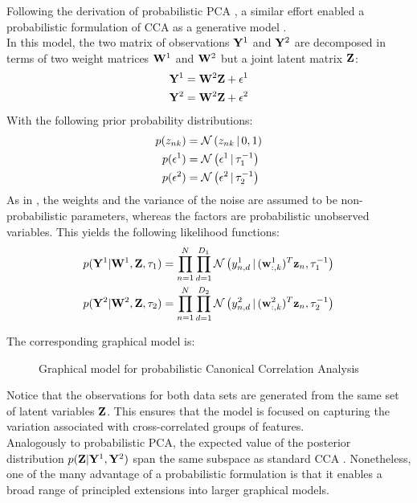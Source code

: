 Following the derivation of probabilistic PCA \cite{Tipping1999}, a similar effort enabled a probabilistic formulation of CCA as a generative model \cite{Bach2005}.\\
In this model, the two matrix of observations ${\bf Y}^{1}$ and ${\bf Y}^{2}$ are decomposed in terms of two weight matrices ${\bf W}^{1}$ and ${\bf W}^{2}$ but a joint latent matrix ${\bf Z}$:
\begin{align*}
	{\bf Y}^{1} &= {\bf W}^{2} {\bf Z} + \epsilon^{1} \\
	{\bf Y}^{2} &= {\bf W}^{2} {\bf Z} + \epsilon^{2}
\end{align*}
With the following prior probability distributions:
\begin{align*}
	p(z_{nk}) &= \mathcal{N}\left(z_{nk} \,|\, 0,1\right) \\
	p(\epsilon^{1}) &= \mathcal{N}\left(\epsilon^{1} \,|\, \tau_{1}^{-1}\right) \\
	p(\epsilon^{2}) &= \mathcal{N}\left(\epsilon^{2} \,|\, \tau_{2}^{-1}\right)
\end{align*}
As in \cite{Tipping1999}, the weights and the variance of the noise are assumed to be non-probabilistic parameters, whereas the factors are probabilistic unobserved variables. This yields the following likelihood functions:
\begin{align} \label{eq:probabilistic_cca_likelihood}
	p({\bf Y}^{1}|{\bf W}^{1},{\bf Z},\tau_{1}) &= \prod_{n=1}^{N} \prod_{d=1}^{D_1} \mathcal{N}\left(y^{1}_{n,d} \,|\, ({\bf w}_{:,k}^{1})^T {\bf z}_{n},\tau_{1}^{-1}\right) \\
	p({\bf Y}^{2}|{\bf W}^{2},{\bf Z},\tau_{2}) &= \prod_{n=1}^{N} \prod_{d=1}^{D_2} \mathcal{N}\left(y^{2}_{n,d} \,|\, ({\bf w}_{:,k}^{2})^T {\bf z}_{n},\tau_{2}^{-1}\right) \nonumber
\end{align}

The corresponding graphical model is:

\begin{figure}[H] \begin{center}
	
	\label{fig:graphical_CCA}
	\caption{Graphical model for probabilistic Canonical Correlation Analysis}
\end{center} \end{figure}

Notice that the observations for both data sets are generated from the same set of latent variables ${\bf Z}$. This ensures that the model is focused on capturing the variation associated with cross-correlated groups of features.\\
Analogously to probabilistic PCA, the expected value of the posterior distribution $p({\bf Z}|{\bf Y}^{1},{\bf Y}^{2})$ span the same subspace as standard CCA \cite{Bach2005}. Nonetheless, one of the many advantage of a probabilistic formulation is that it enables a broad range of principled extensions into larger graphical models.


